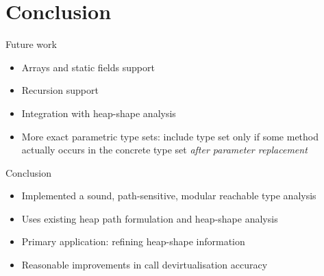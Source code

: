 \documentclass{beamer}
\begin{document}
\section*{Conclusion}
\begin{frame}{Future work}
    \begin{itemize}
        \item Arrays and static fields support
        \item Recursion support
        \item Integration with heap-shape analysis
        \item More exact parametric type sets: include type set only if some method actually occurs in the concrete type set \emph{after parameter replacement}
    \end{itemize}
\end{frame}
\begin{frame}{Conclusion}
\begin{itemize}
    \item Implemented a sound, path-sensitive, modular reachable type analysis
    \item Uses existing heap path formulation and heap-shape analysis
    \item Primary application: refining heap-shape information
    \item Reasonable improvements in call devirtualisation accuracy
\end{itemize}
\end{frame}
\end{document}
